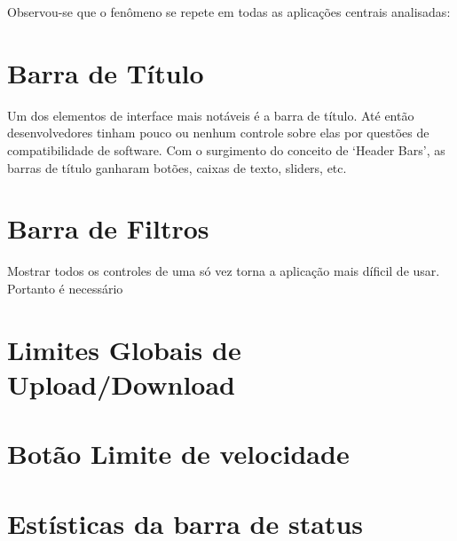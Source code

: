 Observou-se que o fenômeno se repete em todas as aplicações centrais analisadas:




\section{Barra de Título}

Um dos elementos de interface mais notáveis é a barra de título. Até então
desenvolvedores tinham pouco ou nenhum controle sobre elas por questões de
compatibilidade de software. Com o surgimento do conceito de `Header Bars', 
as barras de título ganharam  botões, caixas de texto, sliders, etc.

\section{Barra de Filtros}

Mostrar todos os controles de uma só vez torna a aplicação mais díficil de usar.
Portanto é necessário 

\section{Limites Globais de Upload/Download}

\section{Botão Limite de velocidade}

\section{Estísticas da barra de status}
